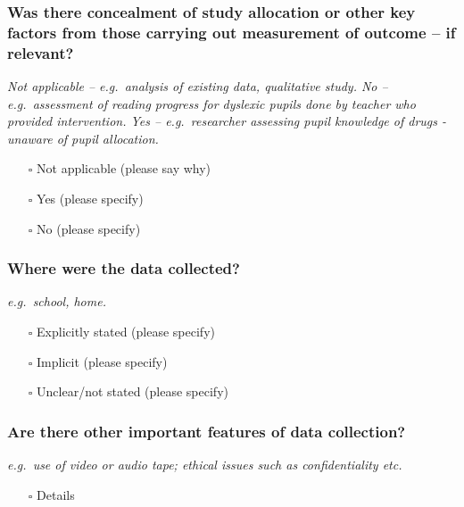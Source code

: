 \documentclass[
  doc, a4paper]{apa7}
\providecommand{\tightlist}{%
  \setlength{\itemsep}{0pt}\setlength{\parskip}{0pt}}
\begin{document}
\subsubsection{Was there concealment of study allocation or other key factors from those carrying out measurement of outcome -- if relevant?}\label{was-there-concealment-of-study-allocation-or-other-key-factors-from-those-carrying-out-measurement-of-outcome-if-relevant}

\emph{Not applicable -- e.g.~analysis of existing data, qualitative study. No -- e.g.~assessment of reading progress for dyslexic pupils done by teacher who provided intervention. Yes -- e.g.~researcher assessing pupil knowledge of drugs - unaware of pupil allocation.}

\begin{itemize}
\tightlist
\item[$\square$]
  Not applicable (please say why)
\item[$\square$]
  Yes (please specify)
\item[$\square$]
  No (please specify)
\end{itemize}

\subsubsection{Where were the data collected?}\label{where-were-the-data-collected}

\emph{e.g.~school, home.}

\begin{itemize}
\tightlist
\item[$\square$]
  Explicitly stated (please specify)
\item[$\square$]
  Implicit (please specify)
\item[$\square$]
  Unclear/not stated (please specify)
\end{itemize}

\subsubsection{Are there other important features of data collection?}\label{are-there-other-important-features-of-data-collection}

\emph{e.g.~use of video or audio tape; ethical issues such as confidentiality etc.}

\begin{itemize}
\tightlist
\item[$\square$]
  Details
\end{itemize}
\end{document}
